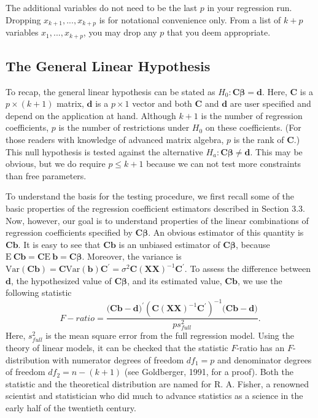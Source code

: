 The additional variables do not need to be the last $p$ in your
regression run. Dropping $x_{k+1},...,x_{k+p}$ is for notational
convenience only. From a list of $k+p$ variables
$x_{1},...,x_{k+p}$, you may drop any $p$ that you deem appropriate.


\subsection{The General Linear Hypothesis}

To recap, the general linear hypothesis can be stated as
$H_{0}:\mathbf{C \boldsymbol \beta =d}$. Here, $\mathbf{C}$ is a
$p\times (k+1)$ matrix, $\mathbf{d}$ is a $p\times 1$ vector and
both $\mathbf{C}$ and $\mathbf{d}$ are user specified and depend on
the application at hand. Although $k+1$ is the number of regression
coefficients, $p$ is the number of restrictions under $H_{0}$ on
these coefficients. (For those readers with knowledge of advanced
matrix algebra, $p$ is the rank of $\mathbf{C}$.) This null
hypothesis is tested against the alternative $H_{a}:\mathbf{C
\boldsymbol \beta \neq d}$. This may be obvious, but we do require
$p \leq k+1$ because we can not test more constraints than free
parameters.

To understand the basis for the testing procedure, we first recall
some of the basic properties of the regression coefficient
estimators described in Section 3.3. Now, however, our goal is to
understand properties of the linear combinations of regression
coefficients specified by $\mathbf{C\boldsymbol \beta } $. An
obvious estimator of this quantity is $\mathbf{Cb}$. It is easy to
see that $\mathbf{Cb}$ is an unbiased estimator of
$\mathbf{C\boldsymbol \beta }$, because $
\mathrm{E~}\mathbf{Cb=C}\mathrm{E~}\mathbf{b=C\boldsymbol \beta }$.
Moreover, the
variance is $\mathrm{Var}\left( \mathbf{Cb}\right) \mathbf{=C}\mathrm{Var}%
\left( \mathbf{b}\right) \mathbf{C}^{\prime }=\sigma
^{2}\mathbf{C}\left( \mathbf{XX}\right) ^{-1}\mathbf{C}^{\prime }$.
To assess the difference between $\mathbf{d}$, the hypothesized
value of $\mathbf{C \boldsymbol \beta }$, and its
estimated value, $\mathbf{Cb}$, we use the following statistic%
\begin{equation}
F-ratio=\frac{(\mathbf{Cb-d)}^{\prime }\left( \mathbf{C}\left( \mathbf{XX}%
\right) ^{-1}\mathbf{C}^{\prime }\right) ^{-1}(\mathbf{Cb-d)}}{ps_{full}^{2}}%
.  \label{E4:GenLinHypF-ratio}
\end{equation}%
Here, $s_{full}^{2}$ is the mean square error from the full
regression model. Using the theory of linear models, it can be
checked that the statistic $F$-ratio has an $F$-distribution with
numerator degrees of freedom $df_{1}=p$ and denominator degrees of
freedom $df_{2}=n-(k+1)$ (see Goldberger, 1991, for a proof). Both
the statistic and the theoretical distribution are named for R. A.
Fisher, a renowned scientist and statistician who did much to
advance statistics as a science in the early half of the twentieth
century.

